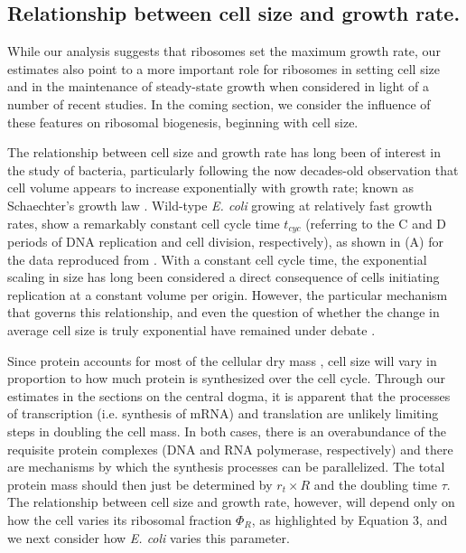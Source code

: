 \subsection{Relationship between cell size and growth rate.}
While our analysis suggests that ribosomes set the maximum growth rate,  our
estimates also point to a more important role for ribosomes in setting cell
size and in the maintenance of steady-state growth  when considered in light of
a number of recent studies. In the coming section, we consider the influence of
these features on ribosomal biogenesis, beginning with cell size.

The relationship between cell size and growth rate has long been of interest in
the study of bacteria, particularly following the now decades-old observation
that cell volume appears to increase exponentially with growth rate; known as
Schaechter's growth law  \citep{schaechter1958, taheriaraghi2015}. Wild-type
\textit{E. coli} growing at relatively fast growth rates, show a remarkably
constant cell cycle time $t_{cyc}$ (referring to the C and D periods of DNA
replication and cell division, respectively), as shown in
(A) for the data reproduced from \citep{si2017}.
With a constant cell cycle time, the exponential scaling in size has long been
considered a direct consequence of cells initiating replication at a constant
volume per origin. However, the particular mechanism that governs this
relationship, and even the question of whether the change in average cell size
is truly exponential  have remained under debate \citep{si2017, harris2018}.

Since protein accounts for most of the cellular dry mass \citep{bremer2008,
basan2015}, cell size will vary in proportion to how much protein is
synthesized over the cell cycle.  Through our estimates in the sections on the
central dogma, it is apparent that the processes of transcription (i.e.
synthesis of mRNA) and translation are unlikely limiting steps in doubling the
cell mass. In both cases, there is an overabundance of the requisite protein
complexes (DNA and RNA polymerase, respectively) and there are mechanisms by
which the synthesis processes can be parallelized. The total protein mass should
then just be determined by $r_t \times R$ and the doubling time
$\tau$. The relationship between cell size and growth rate, however, will
depend only on how the cell varies its ribosomal fraction $\Phi_R$, as highlighted by
Equation 3, and we next consider how \textit{E. coli} varies this parameter.


